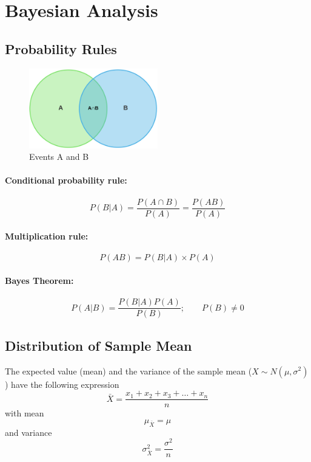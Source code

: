 \documentclass{article}
\begin{document}
\section{Bayesian Analysis}

\subsection{Probability Rules}

\begin{figure}[h!]
    \centering
    \includegraphics[width=0.5\textwidth]{img/venn.png}
    \caption{Events A and B}
    \label{fig:venn}
\end{figure}

\paragraph{Conditional probability rule:}
\begin{equation}
    P(B|A)=\frac{P(A\cap B)}{P(A)}=\frac{P(AB)}{P(A)}
\end{equation}

\paragraph{Multiplication rule:}
\begin{equation}
    P(AB)=P(B|A)\times P(A)
\end{equation}

\paragraph{Bayes Theorem:}
\begin{equation}
    P(A|B)=\frac{P(B|A)P(A)}{P(B)}; \qquad P(B)\neq 0
\end{equation}

\subsection{Distribution of Sample Mean}

The expected value (mean) and the variance of the sample mean ($X\sim N(\mu, \sigma^2)$) have the following expression
\begin{equation}
    \bar{X}=\frac{x_1+x_2+x_3+\ldots+x_n}{n}
\end{equation}
with mean
\begin{equation}
    \mu_{\bar{X}}=\mu
\end{equation}
and variance
\begin{equation}
    \sigma^2_{\bar{X}}=\frac{\sigma^2}{n}
\end{equation}
\end{document}

